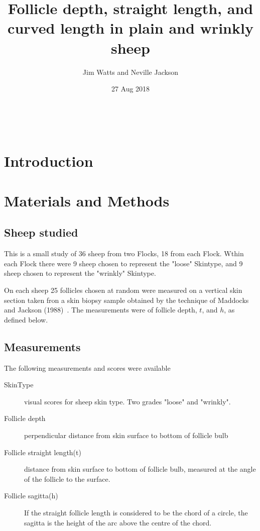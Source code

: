 \documentclass[titlepage]{article}  %
\title{Follicle depth, straight length, and curved length in plain and wrinkly sheep}
\author{Jim Watts and Neville Jackson}
\date{27 Aug 2018}
\begin{document}
 


 
\maketitle      
\tableofcontents

$\newcommand{\E}{\mathrm{E}}$
$\newcommand{\Var}{\mathrm{Var}}$
$\newcommand{\Cov}{\mathrm{Cov}}$ 
$\newcommand{\SD}{\mathrm{SD}}$ 

\clearpage
\section{Introduction} 

\section{Materials and Methods}
\subsection{Sheep studied}
This is a small study of 36 sheep from two Flocks, 18 from each Flock. Wthin each Flock there were 9 sheep chosen to represent the "loose" Skintype, and 9 sheep chosen to represent the "wrinkly" Skintype. 

On each sheep 25 follicles chosen at random were measured on a vertical skin section taken fron a skin biopsy sample obtained by the technique of Maddocks and Jackson (1988)~\cite{madd:88}. The measurements were of follicle depth, $t$, and $h$, as defined below.

\subsection{Measurements}
The following measurements and scores were available
\begin{description}
\item[SkinType] visual scores for sheep skin type. Two grades "loose" and "wrinkly". 
\item[Follicle depth] perpendicular distance from skin surface to bottom of follicle bulb
\item[Follicle straight length(t)] distance from skin surface to bottom of follicle bulb, measured at the angle of the follicle to the surface.
\item[Follicle sagitta(h)] If the straight follicle length is considered to be the chord of a circle, the sagitta is the height of the arc above the centre of the chord.
\end{description}
\end{document}
